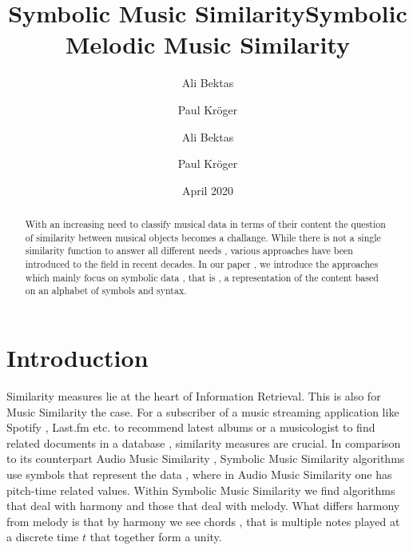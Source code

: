 \documentclass{llncs}
\title{Symbolic Music Similarity}
\author{Ali Bektas \and Paul Kröger}
\date{April 2020}
\begin{document}
	
	\frontmatter  

	
	\tableofcontents

	\mainmatter
	\title{Symbolic Melodic Music Similarity}
	\author{Ali Bektas \and Paul Kröger}
	
	\maketitle


	\begin{abstract}
	With an increasing need to classify musical data in terms of their content 
	the question of similarity between musical objects becomes a challange. While 
	there is not a single similarity function to answer all different needs , various approaches
	have been introduced to the field in recent decades. In our paper , we introduce the approaches
	which mainly focus on symbolic data , that is , a representation of the content based on an alphabet
	of symbols and syntax.
	\end{abstract}

	\section{Introduction}
		Similarity measures lie at the heart of Information Retrieval. This is also for Music Similarity the case. For a subscriber of a music streaming application like Spotify , Last.fm etc. to recommend latest albums or a musicologist to find related documents in a database , similarity measures are crucial. In comparison to its counterpart Audio Music Similarity , Symbolic Music Similarity algorithms use symbols that represent the data , where in Audio Music Similarity one has pitch-time related values. Within Symbolic Music Similarity we find algorithms that deal with harmony and those that deal with melody. What differs harmony from melody is that by harmony we see chords , that is multiple notes played at a discrete time $t$ that together form a unity.  
\end{document}
